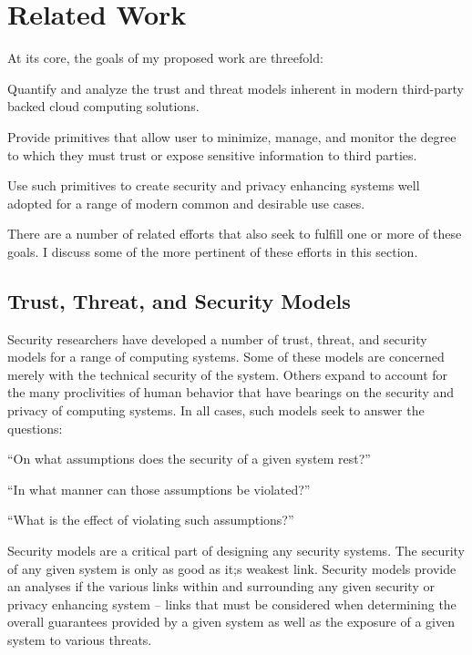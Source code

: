 \chapter{Related Work}
\label{chap:related}

At its core, the goals of my proposed work are threefold:

\begin{packed_item}
\item Quantify and analyze the trust and threat models inherent in
  modern third-party backed cloud computing solutions.
\item Provide primitives that allow user to minimize, manage, and
  monitor the degree to which they must trust or expose sensitive
  information to third parties.
\item Use such primitives to create security and privacy enhancing
  systems well adopted for a range of modern common and desirable use
  cases.
\end{packed_item}

There are a number of related efforts that also seek to fulfill one or
more of these goals. I discuss some of the more pertinent of these
efforts in this section.

\section{Trust, Threat, and Security Models}
\label{chap:related:models}

Security researchers have developed a number of trust, threat, and
security models for a range of computing systems. Some of these models
are concerned merely with the technical security of the system. Others
expand to account for the many proclivities of human behavior that
have bearings on the security and privacy of computing systems. In all
cases, such models seek to answer the questions:

\begin{packed_item}
\item ``On what assumptions does the security of a given system rest?''
\item ``In what manner can those assumptions be violated?''
\item ``What is the effect of violating such assumptions?''
\end{packed_item}

Security models are a critical part of designing any security
systems. The security of any given system is only as good as it;s
weakest link. Security models provide an analyses if the various links
within and surrounding any given security or privacy enhancing system
-- links that must be considered when determining the overall
guarantees provided by a given system as well as the exposure of a
given system to various threats.

